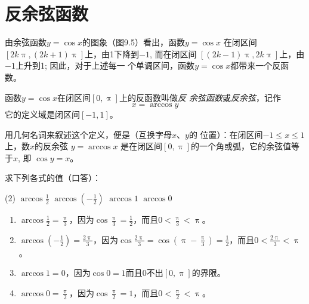 \section{反余弦函数}
由余弦函数$y=\cos x$的图象（图9.5）看出，函数$y=\cos x$
在闭区间$[2k\uppi ,(2k+1)\uppi ]$上，由1下降到$-1$, 而在闭区间
$[(2k-1)\uppi ,2k\uppi]$上，由$-1$上升到1; 因此，对于上述每一
个单调区间，函数$y=\cos x$都带来一个反函数。

\begin{figure}[htp]
    \centering
{}
    \caption{}
\end{figure}

\begin{Definition}
    函数$y=\cos x$在闭区间$[0,\uppi]$上的反函数叫做\emph{反
余弦函数}或\emph{反余弦}，记作
\[x=\arccos y\]
它的定义域是闭区间$[-1,1]$。
\end{Definition}

用几何名词来叙述这个定义，便是（互换字母$x$、$y$的
位置）：在闭区间$-1\leqslant x\leqslant 1$上，数$x$的反余弦
$y=\arccos x$
是在闭区间$[0,\uppi]$的一个角或弧，它的余弦值等于$x$, 即
$\cos y=x$。

\begin{example}
    求下列各式的值（口答）：
\begin{tasks}(2)
    \task $\arccos\frac{1}{2}$
    \task $\arccos\left(-\frac{1}{2}\right)$
    \task $\arccos1$
    \task $\arccos0$
\end{tasks}
\end{example}

\begin{solution}
\begin{enumerate}
    \item $\arccos\frac{1}{2}=\frac{\uppi}{3}$，因为$\cos\frac{\uppi}{3}=\frac{1}{2}$，而且$0<\frac{\uppi}{3}<\uppi$。
    \item $\arccos\left(-\frac{1}{2}\right)=\frac{2\uppi}{3}$，因为$\cos\frac{2\uppi}{3}=\cos\left(\uppi-\frac{\uppi}{3}\right)=\frac{1}{2}$，而且$0<\frac{2\uppi}{3}<\uppi$。
    \item $\arccos1=0$，因为$\cos 0=1$而且0不出$[0,\uppi]$的界限。
    \item $\arccos0=\frac{\uppi}{2}$，因为$\cos\frac{\uppi}{2}=1$，而且$0<\frac{\uppi}{2}<\uppi$。
\end{enumerate}
\end{solution}


